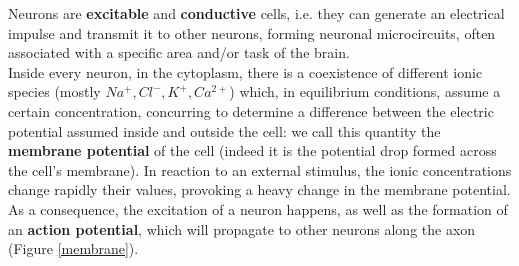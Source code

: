 \documentclass[12pt, a4paper]{report}
\begin{document}
	Neurons are \textbf{excitable} and \textbf{conductive} cells, i.e. they can generate an electrical impulse and transmit it to other neurons, forming neuronal microcircuits, often associated with a specific area and/or task of the brain. \\
	Inside every neuron, in the cytoplasm, there is a coexistence of different ionic species (mostly $Na^+, Cl^-, K^+, Ca^{2+}$) which, in equilibrium conditions, assume a certain concentration, concurring to determine a difference between the electric potential assumed inside and outside the cell: we call this quantity the \textbf{membrane potential} of the cell (indeed it is the potential drop formed across the cell's membrane).  In reaction to an external stimulus, the ionic concentrations change rapidly their values, provoking a heavy change in the membrane potential. As a consequence, the excitation of a neuron happens, as well as the formation of an \textbf{action potential}, which will propagate to other neurons along the axon (Figure \ref{membrane}). 
\end{document}
